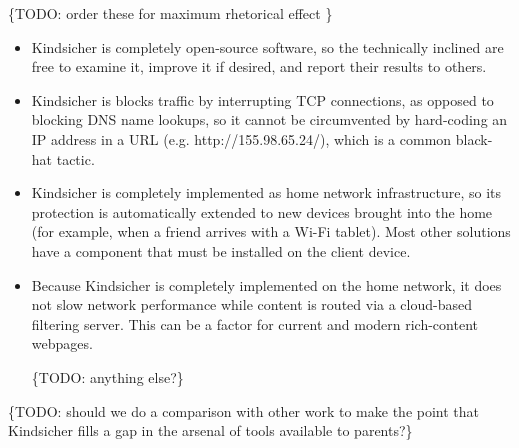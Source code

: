 \{TODO: order these for maximum rhetorical effect \}
\begin{itemize}

\item Kindsicher is completely open-source software, so the
  technically inclined are free to examine it, improve it if desired,
  and report their results to others.

\item Kindsicher is blocks traffic by interrupting TCP connections, as
  opposed to blocking DNS name lookups, so it cannot be circumvented
  by hard-coding an IP address in a URL (e.g. http://155.98.65.24/),
  which is a common black-hat tactic.

\item Kindsicher is completely implemented as home network
  infrastructure, so its protection is automatically extended to new
  devices brought into the home (for example, when a friend arrives
  with a Wi-Fi tablet). Most other solutions have a component that
  must be installed on the client device.

\item Because Kindsicher is completely implemented on the home
  network, it does not slow network performance while content is
  routed via a cloud-based filtering server.  This can be a factor for
  current and modern rich-content webpages.

\{TODO: anything else?\}

\end{itemize}

\{TODO: should we do a comparison with other work to make the point that Kindsicher fills a gap in the arsenal of tools available to parents?\}
